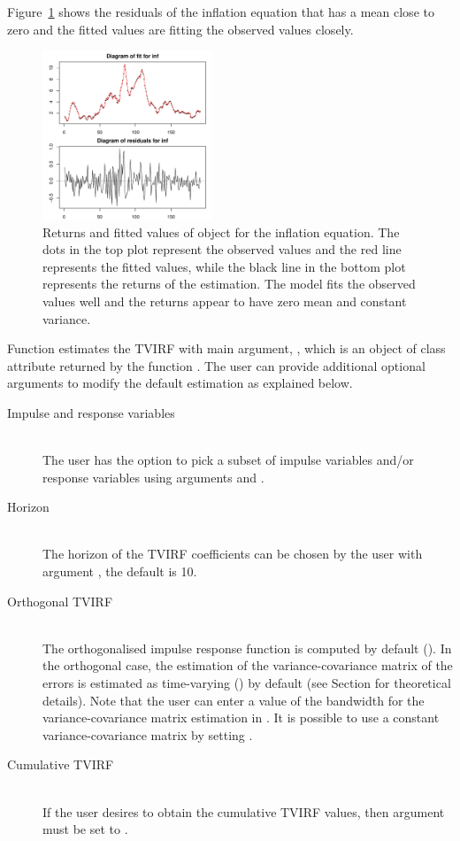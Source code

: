 Figure~\ref{fig:plot2} shows the residuals of the inflation equation that has a mean close to zero and the fitted values are fitting the observed values closely. 

\begin{figure}[!ht]
\centering
\includegraphics[page = 1, width = 0.45\textwidth]{Fig4}
\caption{Returns and fitted values of object  for the inflation equation. The dots in the top plot represent the observed values and the red line represents the fitted values, while the black line in the bottom plot represents the returns of the estimation. The model fits the observed values well and the returns appear to have zero mean and constant variance.\label{fig:plot2}}
\end{figure}


Function  estimates the TVIRF with main argument, , which is an object of class attribute  returned by the function . The user can provide additional optional arguments to modify the default estimation as explained below.

\begin{description}
\item[Impulse and response variables]\hfill\\
The user has the option to pick a subset of impulse variables and/or response variables using arguments  and .
\item[Horizon]\hfill\\
The horizon of the TVIRF coefficients can be chosen by the user with argument , the default is 10. 
\item[Orthogonal TVIRF]\hfill\\
The orthogonalised impulse response function is computed by default (). In the orthogonal case, the estimation of the variance-covariance matrix of the errors is estimated as time-varying () by default (see Section  for theoretical details). Note that the user can enter a value of the bandwidth for the variance-covariance matrix estimation in . It is possible to use a constant variance-covariance matrix by setting .
\item[Cumulative TVIRF]\hfill\\
If the user desires to obtain the cumulative TVIRF values, then argument  must be set to .
\end{description}

